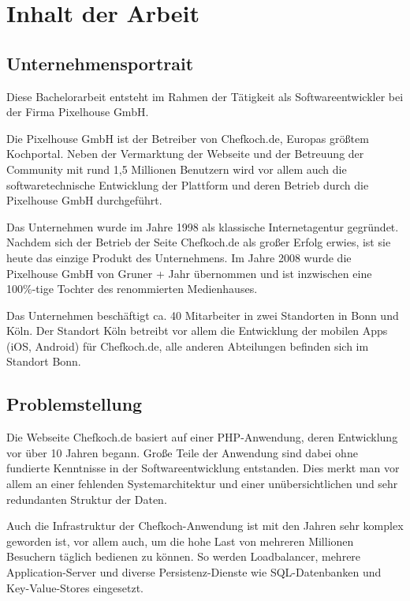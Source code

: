 \section{Inhalt der Arbeit}

\subsection{Unternehmensportrait}

Diese Bachelorarbeit entsteht im Rahmen der Tätigkeit als Softwareentwickler bei der Firma Pixelhouse GmbH.

Die Pixelhouse GmbH ist der Betreiber von Chefkoch.de, Europas größtem Kochportal. Neben der Vermarktung der Webseite und der Betreuung der Community mit rund 1,5 Millionen Benutzern wird vor allem auch die softwaretechnische Entwicklung der Plattform und deren Betrieb durch die Pixelhouse GmbH durchgeführt.

Das Unternehmen wurde im Jahre 1998 als klassische Internetagentur gegründet. Nachdem sich der Betrieb der Seite Chefkoch.de als großer Erfolg erwies, ist sie heute das einzige Produkt des Unternehmens. Im Jahre 2008 wurde die Pixelhouse GmbH von Gruner + Jahr übernommen und ist inzwischen eine 100\%-tige Tochter des renommierten Medienhauses.

Das Unternehmen beschäftigt ca. 40 Mitarbeiter in zwei Standorten in Bonn und Köln. Der Standort Köln betreibt vor allem die Entwicklung der mobilen Apps (iOS, Android) für Chefkoch.de, alle anderen Abteilungen befinden sich im Standort Bonn.

\subsection{Problemstellung}

Die Webseite Chefkoch.de basiert auf einer PHP-Anwendung, deren Entwicklung vor über 10 Jahren begann. Große Teile der Anwendung sind dabei ohne fundierte Kenntnisse in der Softwareentwicklung entstanden. Dies merkt man vor allem an einer fehlenden Systemarchitektur und einer unübersichtlichen und sehr redundanten Struktur der Daten.

Auch die Infrastruktur der Chefkoch-Anwendung ist mit den Jahren sehr komplex geworden ist, vor allem auch, um die hohe Last von mehreren Millionen Besuchern täglich bedienen zu können. So werden Loadbalancer, mehrere Application-Server und diverse Persistenz-Dienste wie SQL-Datenbanken und Key-Value-Stores eingesetzt.


